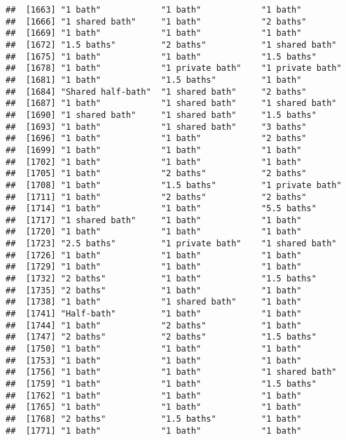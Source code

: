 \documentclass[
]{article}
\begin{document}
\begin{verbatim}
##  [1663] "1 bath"            "1 bath"            "1 bath"           
##  [1666] "1 shared bath"     "1 bath"            "2 baths"          
##  [1669] "1 bath"            "1 bath"            "1 bath"           
##  [1672] "1.5 baths"         "2 baths"           "1 shared bath"    
##  [1675] "1 bath"            "1 bath"            "1.5 baths"        
##  [1678] "1 bath"            "1 private bath"    "1 private bath"   
##  [1681] "1 bath"            "1.5 baths"         "1 bath"           
##  [1684] "Shared half-bath"  "1 shared bath"     "2 baths"          
##  [1687] "1 bath"            "1 shared bath"     "1 shared bath"    
##  [1690] "1 shared bath"     "1 shared bath"     "1.5 baths"        
##  [1693] "1 bath"            "1 shared bath"     "3 baths"          
##  [1696] "1 bath"            "1 bath"            "2 baths"          
##  [1699] "1 bath"            "1 bath"            "1 bath"           
##  [1702] "1 bath"            "1 bath"            "1 bath"           
##  [1705] "1 bath"            "2 baths"           "2 baths"          
##  [1708] "1 bath"            "1.5 baths"         "1 private bath"   
##  [1711] "1 bath"            "2 baths"           "2 baths"          
##  [1714] "1 bath"            "1 bath"            "5.5 baths"        
##  [1717] "1 shared bath"     "1 bath"            "1 bath"           
##  [1720] "1 bath"            "1 bath"            "1 bath"           
##  [1723] "2.5 baths"         "1 private bath"    "1 shared bath"    
##  [1726] "1 bath"            "1 bath"            "1 bath"           
##  [1729] "1 bath"            "1 bath"            "1 bath"           
##  [1732] "2 baths"           "1 bath"            "1.5 baths"        
##  [1735] "2 baths"           "1 bath"            "1 bath"           
##  [1738] "1 bath"            "1 shared bath"     "1 bath"           
##  [1741] "Half-bath"         "1 bath"            "1 bath"           
##  [1744] "1 bath"            "2 baths"           "1 bath"           
##  [1747] "2 baths"           "2 baths"           "1.5 baths"        
##  [1750] "1 bath"            "1 bath"            "1 bath"           
##  [1753] "1 bath"            "1 bath"            "1 bath"           
##  [1756] "1 bath"            "1 bath"            "1 shared bath"    
##  [1759] "1 bath"            "1 bath"            "1.5 baths"        
##  [1762] "1 bath"            "1 bath"            "1 bath"           
##  [1765] "1 bath"            "1 bath"            "1 bath"           
##  [1768] "2 baths"           "1.5 baths"         "1 bath"           
##  [1771] "1 bath"            "1 bath"            "1 bath"           

\end{verbatim}
\end{document}
